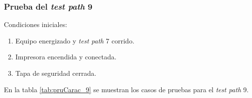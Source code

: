 \subsubsection{Prueba del \textit{test path} 9}
\label{subsubsec:pruCarac_9}

Condiciones iniciales: 

\begin{enumerate}
	\item Equipo energizado y \textit{test path} 7 corrido.
	\item Impresora encendida y conectada.
	\item Tapa de seguridad cerrada.
\end{enumerate}

En la tabla \ref{tab:pruCarac_9} se muestran los casos de pruebas para el \textit{test path} 9.

\pagebreak

